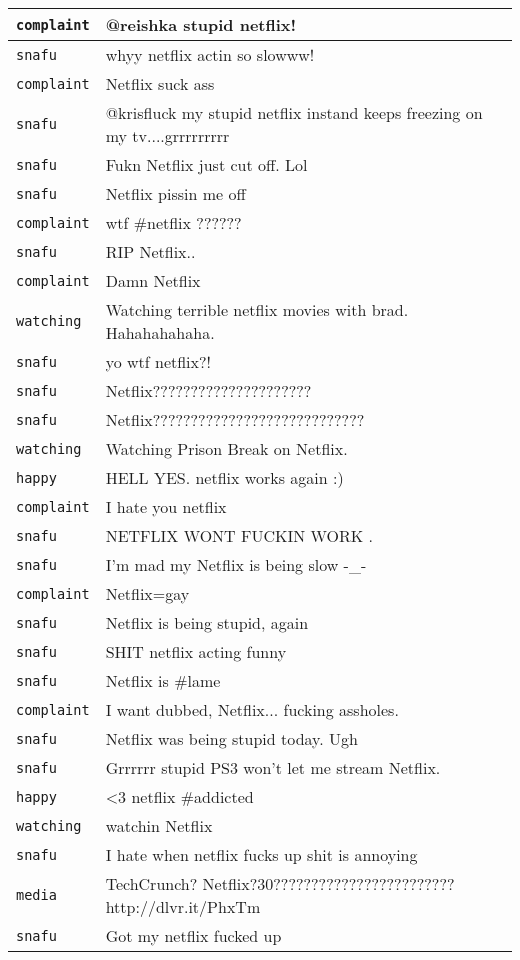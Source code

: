 \begin{center}
\begin{longtable}{|l|p{120mm}|}
      \tabularnewline\hline
         \texttt{complaint} & @reishka stupid netflix!
      \tabularnewline\hline
         \texttt{snafu} & whyy netflix actin so slowww!
      \tabularnewline\hline
         \texttt{complaint} & Netflix suck ass
      \tabularnewline\hline
         \texttt{snafu} & @krisfluck my stupid netflix instand keeps freezing on my tv....grrrrrrrrr
      \tabularnewline\hline
         \texttt{snafu} & Fukn Netflix just cut off. Lol
      \tabularnewline\hline
         \texttt{snafu} & Netflix pissin me off
      \tabularnewline\hline
         \texttt{complaint} & wtf \#netflix ??????
      \tabularnewline\hline
         \texttt{snafu} & RIP Netflix..
      \tabularnewline\hline
         \texttt{complaint} & Damn Netflix
      \tabularnewline\hline
         \texttt{watching} & Watching terrible netflix movies with brad. Hahahahahaha.
      \tabularnewline\hline
         \texttt{snafu} & yo wtf netflix?!
      \tabularnewline\hline
         \texttt{snafu} & Netflix?????????????????????
      \tabularnewline\hline
         \texttt{snafu} & Netflix????????????????????????????
      \tabularnewline\hline
         \texttt{watching} & Watching Prison Break on Netflix.
      \tabularnewline\hline
         \texttt{happy} & HELL YES. netflix works again :)
      \tabularnewline\hline
         \texttt{complaint} & I hate you netflix
      \tabularnewline\hline
         \texttt{snafu} & NETFLIX WONT FUCKIN WORK .
      \tabularnewline\hline
         \texttt{snafu} & I'm mad my Netflix is being slow -\_-
      \tabularnewline\hline
         \texttt{complaint} & Netflix=gay
      \tabularnewline\hline
         \texttt{snafu} & Netflix is being stupid, again
      \tabularnewline\hline
         \texttt{snafu} & SHIT netflix acting funny
      \tabularnewline\hline
         \texttt{snafu} & Netflix is \#lame
      \tabularnewline\hline
         \texttt{complaint} & I want dubbed, Netflix... fucking assholes.
      \tabularnewline\hline
         \texttt{snafu} & Netflix was being stupid today. Ugh
      \tabularnewline\hline
         \texttt{snafu} & Grrrrrr stupid PS3 won't let me stream Netflix.
      \tabularnewline\hline
         \texttt{happy} & <3 netflix \#addicted
      \tabularnewline\hline
         \texttt{watching} & watchin Netflix
      \tabularnewline\hline
         \texttt{snafu} & I hate when netflix fucks up shit is annoying
      \tabularnewline\hline
         \texttt{media} & TechCrunch? Netflix?30???????????????????????? http://dlvr.it/PhxTm
      \tabularnewline\hline
         \texttt{snafu} & Got my netflix fucked up
      \tabularnewline\hline

\end{longtable}
\end{center}
